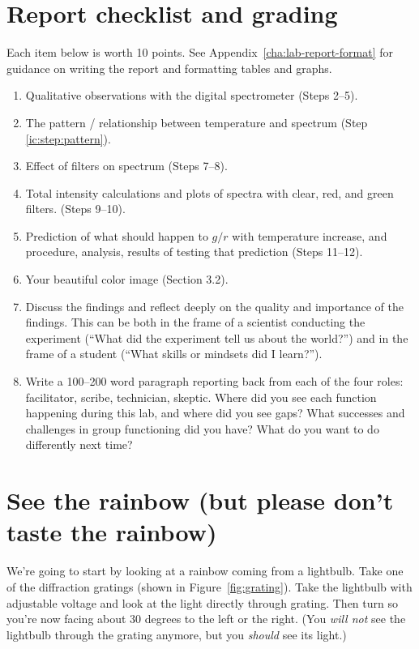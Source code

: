\section{Report checklist and grading}

Each item below is worth 10 points. See Appendix\ \ref{cha:lab-report-format} for guidance on writing the report and formatting tables and graphs.

\begin{enumerate}
	\item Qualitative observations with the digital spectrometer (Steps 2--5).
	\item The pattern / relationship between temperature and spectrum (Step \ref{ic:step:pattern}).
	\item Effect of filters on spectrum (Steps 7--8).
	\item Total intensity calculations and plots of spectra with clear, red, and green filters. (Steps 9--10).
	\item Prediction of what should happen to $g/r$ with temperature increase, and procedure, analysis, results of testing that prediction (Steps 11--12).
	\item Your beautiful color image (Section 3.2).
	\item Discuss the findings and reflect deeply on the quality and importance of
	the findings. This can be both in the frame of a scientist conducting the
	experiment (“What did the experiment tell us about the world?”) and in the
	frame of a student (“What skills or mindsets did I learn?”).
	\item Write a 100--200 word paragraph reporting back from each of the four roles: facilitator, scribe, technician, skeptic. Where did you see each function happening during this lab, and where did you see gaps? What successes and challenges in group functioning did you have? What do you want to do differently next time?
\end{enumerate}
\section{See the rainbow (but please don't taste the rainbow)}
\label{sec:diffraction}
We're going to start by looking at a rainbow coming from a lightbulb. Take one
of the diffraction gratings (shown in Figure~\ref{fig:grating}). Take the
lightbulb with adjustable voltage and look at the light directly through
grating. Then turn so you're now facing about 30 degrees to the left or the
right. (You \emph{will not} see the lightbulb through the grating anymore, but
you \emph{should} see its light.) 


